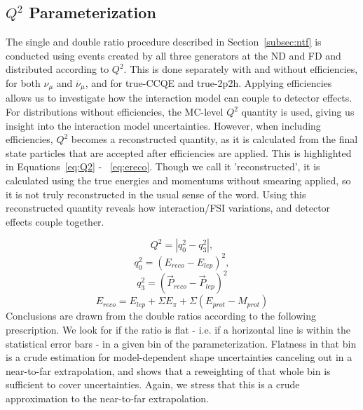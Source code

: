 \documentclass[12pt]{article}
\begin{document}
\subsection{$Q^2$ Parameterization}
\label{subsec:q2}
The single and double ratio procedure described in Section~\ref{subsec:ntf} is conducted using events created by all three generators at the ND and FD and distributed according to $Q^2$. This is done separately with and without efficiencies, for both $\nu_{\mu}$ and $\overline{\nu}_{\mu}$, and for true-CCQE and true-2p2h. Applying efficiencies allows us to investigate how the interaction model can couple to detector effects. For distributions without efficiencies, the MC-level $Q^2$ quantity is used, giving us insight into the interaction model uncertainties. However, when including efficiencies, $Q^2$ becomes a reconstructed quantity, as it is calculated from the final state particles that are accepted after efficiencies are applied. This is highlighted in Equations~\ref{eq:Q2} - ~\ref{eq:ereco}. Though we call it 'reconstructed', it is calculated using the true energies and momentums without smearing applied, so it is not truly reconstructed in the usual sense of the word. Using this reconstructed quantity reveals how interaction/FSI variations, and detector effects couple together.

\begin{equation}
\label{eq:Q2}
Q^2 = |q_0^2 - q_3^2|,
\end{equation}
\begin{equation}
\label{eq:q0}
q_0^2 = (E_{reco} - E_{lep})^2,
\end{equation}
\begin{equation}
\label{eq:q3}
q_3^2 = (\vec{P}_{reco} - \vec{P}_{lep})^2
\end{equation}
\begin{equation}
E_{reco} =E_{lep} + \Sigma E_{\pi} + \Sigma (E_{prot} - M_{prot})
\label{eq:ereco}
\end{equation}
Conclusions are drawn from the double ratios according to the following prescription. We look for if the ratio is flat - i.e. if a horizontal line is within the statistical error bars - in a given bin of the parameterization. Flatness in that bin is a crude estimation for model-dependent shape uncertainties canceling out in a near-to-far extrapolation, and shows that a reweighting of that whole bin is sufficient to cover uncertainties. Again, we stress that this is a crude approximation to the near-to-far extrapolation.
 
\end{document}

